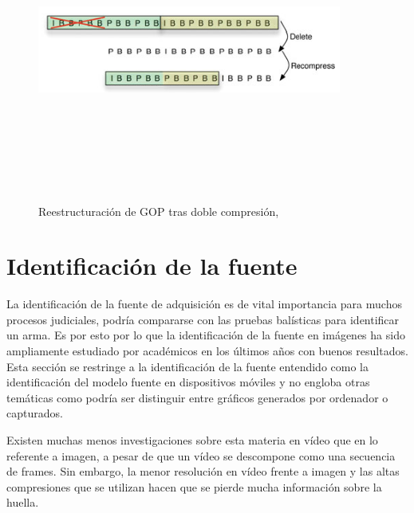 \begin{figure}[ht!]
\begin{center}
\includegraphics[width=10cm,height=10cm,keepaspectratio]{figuras/doble-compresion.png}
\end{center}
\caption{Reestructuración de GOP tras doble compresión, \cite{bestagini:2012}}
\label{fig_doble-compresion}
\end{figure}

\section{Identificación de la fuente}
La identificación de la fuente de adquisición es de vital importancia para muchos procesos judiciales, podría compararse con las pruebas balísticas para identificar un arma. Es por esto por lo que la identificación de la fuente en imágenes ha sido ampliamente estudiado por académicos en los últimos a\~nos con buenos resultados. 
Esta sección se restringe a la identificación de la fuente entendido como la identificación del modelo fuente en dispositivos móviles y no engloba otras temáticas como podría ser distinguir entre gráficos generados por ordenador o capturados. 

Existen muchas menos investigaciones sobre esta materia en vídeo que en lo referente a imagen, a pesar de que un vídeo se descompone como una secuencia de frames. Sin embargo, la menor resolución en vídeo frente a imagen y las altas compresiones que se utilizan hacen que se pierde mucha información sobre la huella. \\

